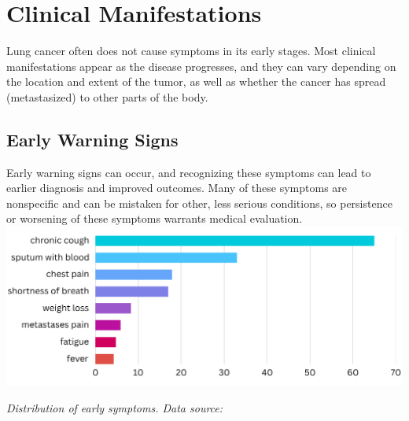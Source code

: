 \section{Clinical Manifestations}
Lung cancer often does not cause symptoms in its early stages. Most clinical manifestations appear 
as the disease progresses, and they can vary depending on the location and extent of the tumor, as 
well as whether the cancer has spread (metastasized) to other parts of the body.

\subsection{Early Warning Signs}
Early warning signs can occur, and recognizing these symptoms can lead to earlier diagnosis and 
improved outcomes. Many of these symptoms are nonspecific and can be mistaken for other, less 
serious conditions, so persistence or worsening of these symptoms warrants medical evaluation.\\

\includegraphics[width=\textwidth]{../assets/03-clinical/early-signs.png}  

\begin{center}
    \textit{Distribution of early symptoms. Data source:\cite{cm2019}}
\end{center}

